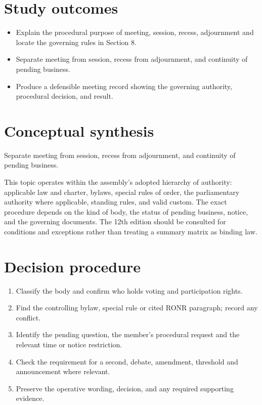 \documentclass[11pt]{article}
\begin{document}
\SuiteOpen
{}
\section{Study outcomes}
\begin{itemize}[leftmargin=*,itemsep=4pt]
\item Explain the procedural purpose of meeting, session, recess, adjournment and locate the governing rules in Section 8.
\item Separate meeting from session, recess from adjournment, and continuity of pending business.
\item Produce a defensible meeting record showing the governing authority, procedural decision, and result.
\end{itemize}

\section{Conceptual synthesis}
Separate meeting from session, recess from adjournment, and continuity of pending business.

This topic operates within the assembly’s adopted hierarchy of authority: applicable law and charter, bylaws, special rules of order, the parliamentary authority where applicable, standing rules, and valid custom. The exact procedure depends on the kind of body, the status of pending business, notice, and the governing documents. The 12th edition should be consulted for conditions and exceptions rather than treating a summary matrix as binding law.
\section{Decision procedure}
\begin{enumerate}[leftmargin=*,itemsep=4pt]
\item Classify the body and confirm who holds voting and participation rights.
\item Find the controlling bylaw, special rule or cited RONR paragraph; record any conflict.
\item Identify the pending question, the member’s procedural request and the relevant time or notice restriction.
\item Check the requirement for a second, debate, amendment, threshold and announcement where relevant.
\item Preserve the operative wording, decision, and any required supporting evidence.
\end{enumerate}
\end{document}
